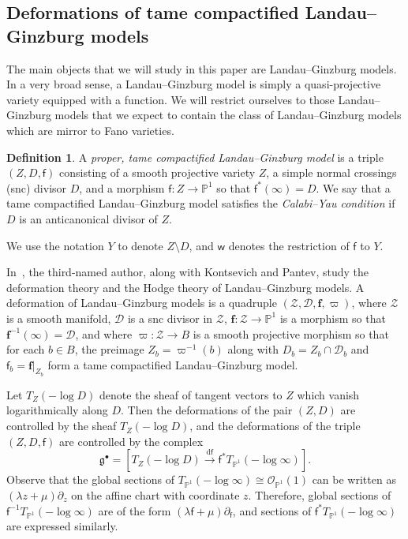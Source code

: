 \documentclass[10pt]{amsart}
\numberwithin{equation}{section}
\theoremstyle{plain}
\theoremstyle{definition}
\newtheorem{definition}[theorem]{Definition}
\theoremstyle{remark}
\begin{document}
\subsection{Deformations of tame compactified Landau--Ginzburg models}\label{subsection:def}

The main objects that we will study in this paper are Landau--Ginzburg models. In a very broad sense, a Landau--Ginzburg model is simply a quasi-projective variety equipped with a function. We will restrict ourselves to those Landau--Ginzburg models that we expect to contain the class of Landau--Ginzburg models which are mirror to Fano varieties.

\begin{definition}\label{definition:tcom}
  A \emph{proper, tame compactified Landau--Ginzburg model} is a triple \((Z,D,\mathsf{f})\) consisting of a smooth projective variety \(Z\), a simple normal crossings (snc) divisor \(D\), and a morphism \(\mathsf{f} \colon Z \rightarrow \mathbb{P}^1\) so that \(\mathsf{f}^*(\infty) = D\). We say that a tame compactified Landau--Ginzburg model satisfies the \emph{Calabi--Yau condition} if \(D\) is an anticanonical divisor of \(Z\).

  We use the notation \(Y\) to denote \(Z\setminus D\), and \(\mathsf{w}\) denotes the restriction of \(\mathsf{f}\) to \(Y\).
\end{definition}

In~\cite{katzarkov2017bogomolov}, the third-named author, along with Kontsevich and Pantev, study the deformation theory and the Hodge theory of Landau--Ginzburg models. A deformation of Landau--Ginzburg models is a quadruple \((\mathscr{Z},\mathscr{D},\bm{f}, \varpi)\), where \(\mathscr{Z}\) is a smooth manifold, \(\mathscr{D}\) is a snc divisor in \(\mathscr{Z}\), \({\bm f} \colon \mathscr{Z}\rightarrow \mathbb{P}^1\) is a morphism so that \(\bm{f}^{-1}(\infty) = \mathscr{D}\), and where \(\varpi \colon \mathscr{Z}\rightarrow B\) is a smooth projective morphism so that for each \(b \in B\), the preimage \(Z_b = \varpi^{-1}(b)\)  along with \(D_b = Z_b \cap \mathscr{D}_b\) and \(\mathsf{f}_b = \bm{f}|_{Z_b}\) form a tame compactified Landau--Ginzburg model.

Let \(T_Z(-\log D)\) denote the sheaf of tangent vectors to \(Z\) which vanish logarithmically along \(D\). Then the deformations of the pair \((Z,D)\) are controlled by the sheaf \(T_Z(-\log D)\), and the deformations of the triple \((Z,D,\mathsf{f})\) are controlled by the complex
\[
  \mathfrak{g}^\bullet = \left[  T_Z(-\log D) \xrightarrow{\mathrm{d}\mathsf{f}} \mathsf{f}^*T_{\mathbb{P}^1}(-\log \infty)\right].
\]
Observe that the global sections of \(T_{\mathbb{P}^1}(-\log \infty)\cong \mathcal{O}_{\mathbb{P}^1}(1)\) can be written as \((\lambda z + \mu)\partial_z\) on the affine chart with coordinate \(z\). Therefore, global sections of \(\mathsf{f}^{-1}T_{\mathbb{P}^1}(-\log \infty)\) are of the form \((\lambda \mathsf{f}  + \mu)\partial_\mathsf{f}\), and sections of \(\mathsf{f}^*T_{\mathbb{P}^1}(-\log \infty)\) are expressed similarly.
\end{document}
